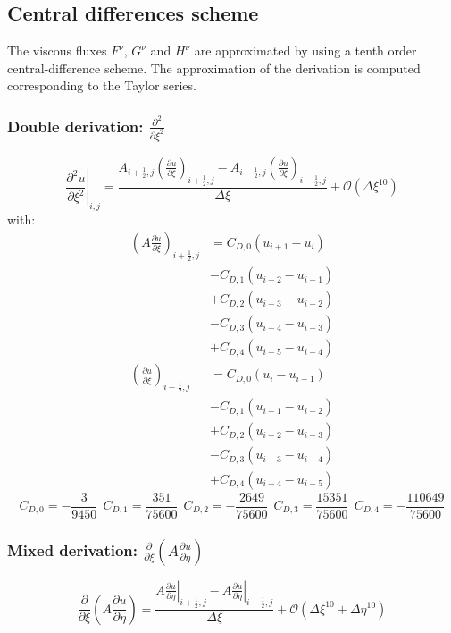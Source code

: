 \subsection{Central differences scheme}
The viscous fluxes $F^\nu$, $G^\nu$ and $H^\nu$ are approximated by using a tenth order central-difference scheme. 
The approximation of the derivation is computed corresponding to the Taylor series.
\subsubsection{Double derivation: $\frac{\partial^2}{\partial \xi^2}$}
\begin{equation}
\left. \frac{\partial^2 u}{\partial \xi^2}\right|_{i,j}=\frac{A_{i+\frac{1}{2},j} \left(\frac{\partial u}{\partial \xi}\right)_{i+\frac{1}{2},j}-A_{i-\frac{1}{2},j} \left(\frac{\partial u}{\partial \xi}\right)_{i-\frac{1}{2},j}}{\varDelta \xi}
+\mathcal O\left(\varDelta \xi^{10}\right)
\end{equation}
with:
\begin{eqnarray}
\left(A \frac{\partial u}{\partial \xi}\right)_{i+\frac{1}{2},j}&=
C_{D,0}\left(u_{i+1}-u_{i} \right)\\ \nonumber
&-C_{D,1}\left(u_{i+2}-u_{i-1} \right)\\ \nonumber
&+C_{D,2}\left(u_{i+3}-u_{i-2} \right)\\ \nonumber
&-C_{D,3}\left(u_{i+4}-u_{i-3} \right)\\ \nonumber
&+C_{D,4}\left(u_{i+5}-u_{i-4} \right)
\\
\left(\frac{\partial u}{\partial \xi}\right)_{i-\frac{1}{2},j}&=
C_{D,0}\left(u_{i}-u_{i-1} \right)\\ \nonumber
&-C_{D,1}\left(u_{i+1}-u_{i-2} \right)\\ \nonumber
&+C_{D,2}\left(u_{i+2}-u_{i-3} \right)\\ \nonumber
&-C_{D,3}\left(u_{i+3}-u_{i-4} \right)\\ \nonumber
&+C_{D,4}\left(u_{i+4}-u_{i-5} \right)
\end{eqnarray}
\begin{equation}
C_{D,0}=-\frac{3}{9450}\ \ 
C_{D,1}=\frac{351}{75600}\ \ 
C_{D,2}=-\frac{2649}{75600}\ \ 
C_{D,3}=\frac{15351}{75600}\ \ 
C_{D,4}=-\frac{110649}{75600}
\end{equation}

\subsubsection{Mixed derivation: $\frac{\partial}{\partial \xi} \left(A\frac{\partial u}{ \partial \eta}\right)$}
\begin{equation}
\frac{\partial}{\partial \xi} \left(A\frac{\partial u}{ \partial \eta}\right)=
\frac{ \left. A\frac{\partial u}{\partial \eta}\right|_{i+\frac{1}{2},j} - \left. A\frac{\partial u}{\partial \eta}\right|_{i-\frac{1}{2},j}}{\varDelta \xi}
+\mathcal O\left(\varDelta \xi^{10}+\varDelta \eta^{10}\right)
\end{equation}

